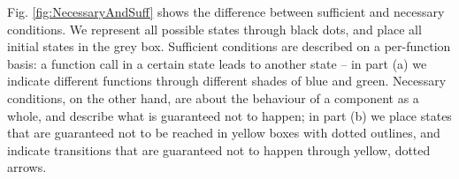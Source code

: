Fig. \ref{fig:NecessaryAndSuff} shows
the difference between sufficient and necessary conditions. 
We
represent  all possible states through black dots, and place all  initial states in the grey box.
Sufficient conditions are described on a per-function basis: 
a function call in a certain state leads to another state
-- in part (a) we indicate different functions through different shades of blue and green. 
Necessary conditions, on the other hand, are about the behaviour of a component
as a whole, 
and describe what is guaranteed not to happen;
in part (b) we place  states that are guaranteed not to be reached in yellow boxes
with dotted outlines,
and indicate transitions that are guaranteed not to happen through
yellow, dotted arrows.


 


